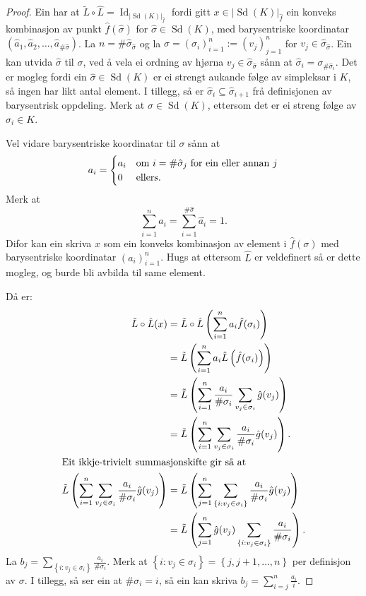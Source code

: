 \documentclass[a4paper, 12pt, norsk]{article}
\theoremstyle{plain}
\theoremstyle{definition}
\newcommand{\gr}[1]{ \lvert #1 \rvert } %
\newcommand{\set}[1]{ \left\{ #1 \right\} } %
\newcommand{\tuple}[1]{ \left( #1 \right) } %
\DeclareMathOperator{\Sd}{Sd} %
\DeclareMathOperator{\Id}{Id} %
\begin{document}
\begin{proof}
	Ein har at \( \tilde{L}\circ\hat{L} = \Id_{\gr{\Sd(K)}_{\hat{f}}} \) fordi gitt \( x \in \gr{\Sd(K)}_{\hat{f}} \) ein konveks kombinasjon av punkt \( \hat{f}(\hat{\sigma}) \) for \( \hat{\sigma} \in \Sd(K) \), med barysentriske koordinatar \( \tuple{\hat{a}_1, \hat{a}_2, \dots, \hat{a}_{\#\hat{\sigma}}} \). La \( n = \#\hat{\sigma}_{\hat{\sigma}} \) og la \( \sigma = \tuple{\sigma_i}_{i=1}^{n} := \tuple{v_j}_{j=1}^{n} \) for \( v_j \in \hat{\sigma}_{\hat{\sigma}} \). Ein kan utvida \( \hat{\sigma} \) til \( \sigma \), ved å vela ei ordning av hjørna \( v_j \in \hat{\sigma}_{\hat{\sigma}} \) sånn at \( \hat{\sigma}_i = \sigma_{\#\hat{\sigma}_i} \). Det er mogleg fordi ein \( \hat{\sigma} \in \Sd(K) \) er ei strengt aukande følge av simpleksar i \( K \), så ingen har likt antal element. I tillegg, så er \( \hat{\sigma}_i \subseteq \hat{\sigma}_{i+1} \) frå definisjonen av barysentrisk oppdeling. Merk at \( \sigma \in \Sd(K) \), ettersom det er ei streng følge av \( \sigma_i \in K \).

	Vel vidare barysentriske koordinatar til \( \sigma \) sånn at
	\[
		a_i =
		\begin{cases}
			a_i & \text{om \( i = \#\hat{\sigma}_j \) for ein eller annan \( j \)} \\
			0 & \text{ellers}.
		\end{cases}
	\]
	Merk at
	\[
		\sum_{i=1}^n a_i = \sum_{i=1}^{\#\hat{\sigma}}\hat{a_i}=1.
	\]
	Difor kan ein skriva \( x \) som ein konveks kombinasjon av element i \( \hat{f}(\sigma) \) med barysentriske koordinatar \( \tuple{a_i}_{i=1}^n \). Hugs at ettersom \( \hat{L} \) er veldefinert så er dette mogleg, og burde bli avbilda til same element.

	Då er:
	\begin{align*}
		\tilde{L}\circ\hat{L}(x) &= \tilde{L}\circ\hat{L}\tuple{\sum_{i=1}^n a_i \hat{f}(\sigma_i)} \\
		&= \tilde{L}\tuple{\sum_{i=1}^n a_i \hat{L}\tuple{\hat{f}(\sigma_i)}} \\
		&= \tilde{L}\tuple{\sum_{i=1}^n \frac{a_i}{\#\sigma_i}\sum_{v_j \in \sigma_i}\hat{g}(v_j)} \\
		&= \tilde{L}\tuple{\sum_{i=1}^n\sum_{v_j \in \sigma_i}\frac{a_i}{\#\sigma_i}\hat{g}(v_j)}. \\
		\intertext{Eit ikkje-trivielt summasjonskifte gir så at}
		\tilde{L}\tuple{\sum_{i=1}^n\sum_{v_j \in \sigma_i}\frac{a_i}{\#\sigma_i}\hat{g}(v_j)} &= \tilde{L}\tuple{\sum_{j=1}^n\sum_{\set{i:v_j\in\sigma_i}}\frac{a_i}{\#\sigma_i}\hat{g}(v_j)} \\
		&= \tilde{L}\tuple{\sum_{j=1}^n \hat{g}(v_j) \sum_{\set{i:v_j\in\sigma_i}}\frac{a_i}{\#\sigma_i}}.
	\end{align*}
	La \( b_j = \sum_{\set{i:v_j\in\sigma_i}}\frac{a_i}{\#\sigma_i} \). Merk at \( \set{i : v_j \in \sigma_i} = \set{j, j+1, \dots, n } \) per definisjon av \( \sigma \). I tillegg, så ser ein at \( \#\sigma_i = i \), så ein kan skriva \( b_j = \sum_{i=j}^n \frac{a_i}{i} \).


\end{proof}
\end{document}
